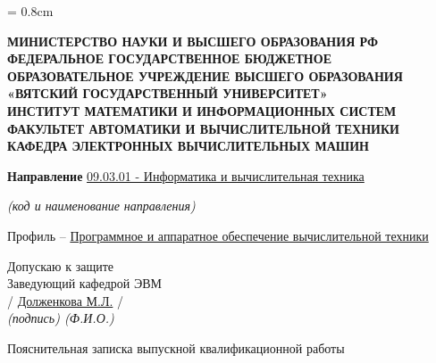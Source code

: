 \begin{titlepage}
	\newpage
	\singlespacing
	\topskip = 0.8cm
	\large

	\begin{center}
		\large
		\bfseries
		МИНИСТЕРСТВО НАУКИ И ВЫСШЕГО ОБРАЗОВАНИЯ РФ \\
		ФЕДЕРАЛЬНОЕ ГОСУДАРСТВЕННОЕ БЮДЖЕТНОЕ \\
		ОБРАЗОВАТЕЛЬНОЕ УЧРЕЖДЕНИЕ ВЫСШЕГО ОБРАЗОВАНИЯ \\
		«ВЯТСКИЙ ГОСУДАРСТВЕННЫЙ УНИВЕРСИТЕТ» \\
		ИНСТИТУТ МАТЕМАТИКИ И ИНФОРМАЦИОННЫХ СИСТЕМ \\
		ФАКУЛЬТЕТ АВТОМАТИКИ И ВЫЧИСЛИТЕЛЬНОЙ ТЕХНИКИ \\
		КАФЕДРА ЭЛЕКТРОННЫХ ВЫЧИСЛИТЕЛЬНЫХ МАШИН
	\end{center}

	\vspace{0.8cm}
	\begin{center}
		\textbf{Направление}
		\uline{09.03.01 - Информатика и вычислительная техника}

		\small
		\textit{(код и наименование направления)}

		\large
		Профиль – \uline{Программное и аппаратное обеспечение вычислительной техники}
	\end{center}

	\vspace{0.8cm}
	\begin{flushright}
		Допускаю к защите \\
		Заведующий кафедрой ЭВМ \\
		\vspace{1mm}
		\uline{\hspace{3cm}} / \uline{Долженкова М.Л.} / \\
		\vspace{1mm}
		\small
		\itshape
		(подпись) \hspace{1.8cm} (Ф.И.О.) \hspace{1.4cm}

	\end{flushright}

	\vspace{1.5cm}
	\begin{center}
		\huge
		\bfseries
		\topic
	\end{center}

	\vspace{0.5cm}
	\begin{center}
		Пояснительная записка выпускной квалификационной работы \\
		\tpga
	\end{center}


\end{titlepage}
